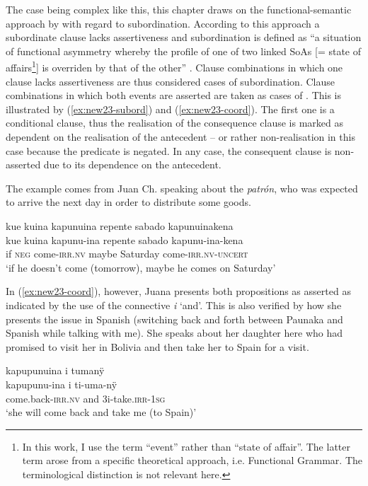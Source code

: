 The case being complex like this, this chapter draws on the functional-semantic approach by \citet[]{Cristofaro2003} with regard to subordination. According to this approach a subordinate clause lacks assertiveness and subordination is defined as “a situation of functional asymmetry whereby the profile of one of two linked SoAs [= state of affairs\footnote{In this work, I use the term “event” rather than “state of affair”. The latter term arose from a specific theoretical approach, i.e. Functional Grammar. The terminological distinction is not relevant here.}] is overriden by that of the other” \citep[39]{Cristofaro2003}. Clause combinations in which one clause lacks assertiveness are thus considered cases of subordination. Clause combinations in which both events are asserted are taken as cases of . This is illustrated by (\ref{ex:new23-subord}) and (\ref{ex:new23-coord}). The first one is a conditional clause, thus the realisation of the consequence clause is marked as dependent on the realisation of the antecedent – or rather non-realisation in this case because the predicate is negated. In any case, the consequent clause is non-asserted due to its dependence on the antecedent.

The example comes from Juan Ch. speaking about the \textit{patrón}, who was expected to arrive the next day in order to distribute some goods.

\ea\label{ex:new23-subord}
\begingl
\glpreamble kue kuina kapunuina repente sabado kapunuinakena\\
\gla kue kuina kapunu-ina repente sabado kapunu-ina-kena\\
\glb if \textsc{neg} come-\textsc{irr.nv} maybe Saturday come-\textsc{irr.nv}-\textsc{uncert} \\
\glft ‘if he doesn’t come (tomorrow), maybe he comes on Saturday’
\endgl
\trailingcitation{[nxx-p630101g-1.066]}
\xe


In (\ref{ex:new23-coord}), however, Juana presents both propositions as asserted as indicated by the use of the connective \textit{i} ‘and’. This is also verified by how she presents the issue in Spanish (switching back and forth between Paunaka and Spanish while talking with me). She speaks about her daughter here who had promised to visit her in Bolivia and then take her to Spain for a visit.

\ea\label{ex:new23-coord}
\begingl
\glpreamble kapupunuina i tumanÿ\\
\gla kapupunu-ina i ti-uma-nÿ\\
\glb come.back-\textsc{irr.nv} and 3i-take.\textsc{irr}-1\textsc{sg}\\
\glft ‘she will come back and take me (to Spain)’
\endgl
\trailingcitation{[jxx-p110923l-1.258]}
\xe

